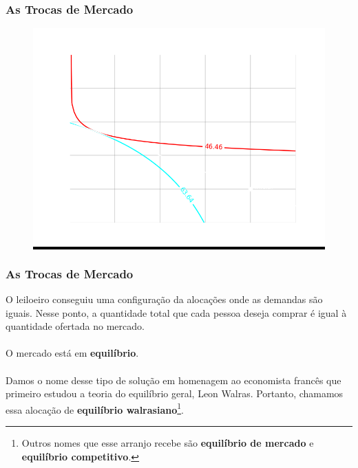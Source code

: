 \documentclass{beamer}[10]
\begin{document}
\begin{frame}
	\frametitle{As Trocas de Mercado}

	\begin{figure}[H]
		\centering
		\colorbox{black}{\includegraphics[scale=0.6]{cap32_4-caixa_edgeworth_6.png}}
	\end{figure}

\end{frame}

\begin{frame}
	\frametitle{As Trocas de Mercado}


	O leiloeiro conseguiu uma configuração da alocações onde as demandas são iguais. Nesse ponto, a quantidade total que cada pessoa deseja comprar é igual à quantidade ofertada no mercado. 
	\\~\\
	O mercado está em \textbf{equilíbrio}. 
	\\~\\
	Damos o nome desse tipo de solução em homenagem ao economista francês que primeiro estudou a teoria do equilíbrio geral, Leon Walras. Portanto, chamamos essa alocação de \textbf{equilíbrio walrasiano}\footnote{Outros nomes que esse arranjo recebe são \textbf{equilíbrio de mercado} e \textbf{equilíbrio competitivo}.}.

\end{frame}
\end{document}
